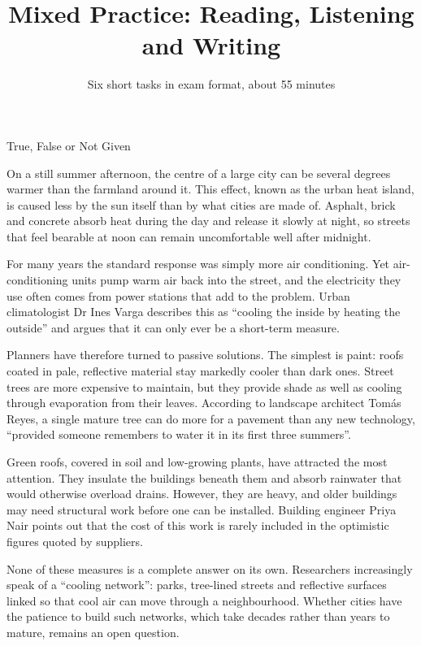 \documentclass{tutordesk}
\title{Mixed Practice: Reading, Listening and Writing}
\subtitle{Six short tasks in exam format, about 55 minutes}
\begin{document}
\maketitle

\begin{exercise}[tag=IELTS Reading]{True, False or Not Given}

\begin{passage}
On a still summer afternoon, the centre of a large city can be several degrees
warmer than the farmland around it. This effect, known as the urban heat island, is caused
less by the sun itself than by what cities are made of. Asphalt, brick and concrete absorb
heat during the day and release it slowly at night, so streets that feel bearable at noon
can remain uncomfortable well after midnight.

For many years the standard response was simply more air conditioning. Yet
air-conditioning units pump warm air back into the street, and the electricity they use
often comes from power stations that add to the problem. Urban climatologist Dr Ines Varga
describes this as \enquote{cooling the inside by heating the outside} and argues that it
can only ever be a short-term measure.

Planners have therefore turned to passive solutions. The simplest is paint: roofs
coated in pale, reflective material stay markedly cooler than dark ones. Street trees are
more expensive to maintain, but they provide shade as well as cooling through evaporation
from their leaves. According to landscape architect Tom\'as Reyes, a single mature tree can
do more for a pavement than any new technology, \enquote{provided someone remembers to
water it in its first three summers}.

Green roofs, covered in soil and low-growing plants, have attracted the most
attention. They insulate the buildings beneath them and absorb rainwater that would
otherwise overload drains. However, they are heavy, and older buildings may need structural
work before one can be installed. Building engineer Priya Nair points out that the cost of
this work is rarely included in the optimistic figures quoted by suppliers.

None of these measures is a complete answer on its own. Researchers increasingly
speak of a \enquote{cooling network}: parks, tree-lined streets and reflective surfaces
linked so that cool air can move through a neighbourhood. Whether cities have the patience
to build such networks, which take decades rather than years to mature, remains an open
question.
\end{passage}


\end{exercise}
\end{document}
